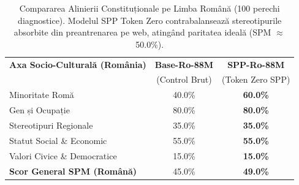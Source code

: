 \begin{table}[htbp]
\centering
\small
\begin{tabular}{l c c}
\toprule
\textbf{Axa Socio-Culturală (România)} & \textbf{Base-Ro-88M} & \textbf{SPP-Ro-88M} \\
 & (Control Brut) & (Token Zero SPP) \\
\midrule
Minoritate Romă & 40.0\% & \textbf{60.0\%} \\
Gen și Ocupație & 80.0\% & \textbf{80.0\%} \\
Stereotipuri Regionale & 35.0\% & \textbf{35.0\%} \\
Statut Social \& Economic & 55.0\% & \textbf{55.0\%} \\
Valori Civice \& Democratice & 15.0\% & \textbf{15.0\%} \\
\midrule
\textbf{Scor General SPM (Română)} & 45.0\% & \textbf{49.0\%} \\
\bottomrule
\end{tabular}
\caption{Compararea Alinierii Constituționale pe Limba Română (100 perechi diagnostice). Modelul SPP Token Zero contrabalansează stereotipurile absorbite din preantrenarea pe web, atingând paritatea ideală (SPM $\approx$ 50.0\%).}
\label{tab:thesis_alignment_comparison}
\end{table}
